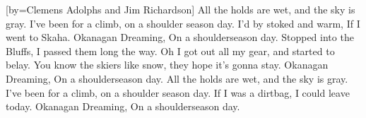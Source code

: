 [by={Clemens Adolphs and Jim Richardson}]
\beginverse
All the holds are wet,
and the sky is gray.
I've been for a climb,
on a shoulder season day.
I'd by stoked and warm,
If I went to Skaha.
Okanagan Dreaming,
On a shoulderseason day.
\endverse
\beginverse
Stopped into the Bluffs,
I passed them long the way.
Oh I got out all my gear,
and started to belay.
You know the skiers like snow,
they hope it's gonna stay.
Okanagan Dreaming,
On a shoulderseason day.
\endverse
\beginverse
All the holds are wet,
and the sky is gray.
I've been for a climb,
on a shoulder season day.
If I was a dirtbag,
I could leave today.
Okanagan Dreaming,
On a shoulderseason day.
\endverse
\endsong
